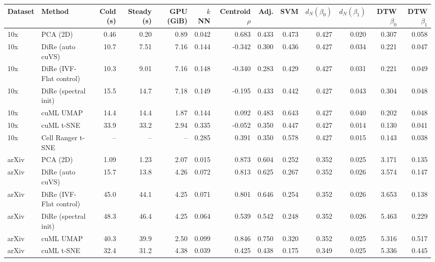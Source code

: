 \begin{tabular}{@{}llrrrrrrrrrrr@{}}
\toprule
Dataset & Method & Cold (s) & Steady (s) & GPU (GiB) & $k$NN & Centroid $\rho$ & Adj. & SVM & $d_N(\beta_0)$ & $d_N(\beta_1)$ & DTW $\beta_0$ & DTW $\beta_1$ \\
\midrule
10x & PCA (2D) & 0.46 & 0.20 & 0.89 & 0.042 & 0.683 & 0.433 & 0.473 & 0.427 & 0.020 & 0.307 & 0.058 \\
10x & DiRe (auto cuVS) & 10.7 & 7.51 & 7.16 & 0.144 & -0.342 & 0.300 & 0.436 & 0.427 & 0.034 & 0.221 & 0.047 \\
10x & DiRe (IVF-Flat control) & 10.3 & 9.01 & 7.16 & 0.148 & -0.340 & 0.283 & 0.429 & 0.427 & 0.031 & 0.221 & 0.049 \\
10x & DiRe (spectral init) & 15.5 & 14.7 & 7.18 & 0.149 & -0.195 & 0.433 & 0.442 & 0.427 & 0.043 & 0.304 & 0.048 \\
10x & cuML UMAP & 14.4 & 14.4 & 1.87 & 0.144 & 0.092 & 0.483 & 0.643 & 0.427 & 0.040 & 0.202 & 0.048 \\
10x & cuML t-SNE & 33.9 & 33.2 & 2.94 & 0.335 & -0.052 & 0.350 & 0.447 & 0.427 & 0.014 & 0.130 & 0.041 \\
10x & Cell Ranger t-SNE & -- & -- & -- & 0.285 & 0.391 & 0.350 & 0.578 & 0.427 & 0.015 & 0.143 & 0.038 \\
\addlinespace
arXiv & PCA (2D) & 1.09 & 1.23 & 2.07 & 0.015 & 0.873 & 0.604 & 0.252 & 0.352 & 0.025 & 3.171 & 0.135 \\
arXiv & DiRe (auto cuVS) & 15.7 & 13.8 & 4.26 & 0.072 & 0.813 & 0.625 & 0.267 & 0.352 & 0.026 & 3.574 & 0.147 \\
arXiv & DiRe (IVF-Flat control) & 45.0 & 44.1 & 4.25 & 0.071 & 0.801 & 0.646 & 0.254 & 0.352 & 0.026 & 3.653 & 0.138 \\
arXiv & DiRe (spectral init) & 48.3 & 46.4 & 4.25 & 0.064 & 0.539 & 0.542 & 0.248 & 0.352 & 0.026 & 5.463 & 0.229 \\
arXiv & cuML UMAP & 40.3 & 39.9 & 2.50 & 0.099 & 0.846 & 0.750 & 0.320 & 0.352 & 0.025 & 5.316 & 0.517 \\
arXiv & cuML t-SNE & 32.4 & 31.2 & 4.38 & 0.039 & 0.425 & 0.438 & 0.175 & 0.349 & 0.025 & 5.336 & 0.445 \\
\bottomrule
\end{tabular}
